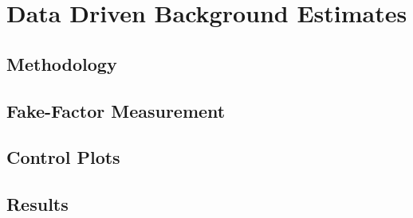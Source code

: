 \section{Data Driven Background Estimates}
\label{sec:ddbg}

\subsection{Methodology}
\subsection{Fake-Factor Measurement}
\subsection{Control Plots}
\subsection{Results}
